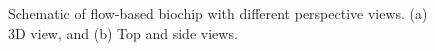 \documentclass[journal]{IEEEtran}
\begin{document}
\begin{figure}[htbp]
\centering
{}%
\hfil
%
\caption{Schematic of flow-based biochip with different perspective views. (a) 3D view, and (b) Top and side views. }
\label{fig:schematic}
\end{figure}
\end{document}
